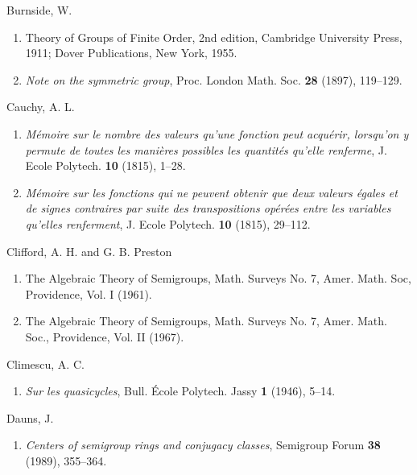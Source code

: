 \documentclass{surv-l}
\numberwithin{equation}{section}
\numberwithin{table}{section}
\numberwithin{figure}{section}
\theoremstyle{plain}
\theoremstyle{definition}
\begin{document}
\begin{thebibliography}{}
\item[] Burnside, W.
\begin{enumerate}
\item \label{bib6b} Theory of Groups of Finite Order, 2nd edition, Cambridge
University Press, 1911; Dover Publications, New York,
1955.

\item \label{bib6a} \emph{Note on the symmetric group}, Proc. London Math.
Soc. \textbf{28} (1897), 119--129.
\end{enumerate}

\item[] Cauchy, A. L.
\begin{enumerate}
\item \label{bib7} \emph{M\'{e}moire sur le nombre des valeurs qu'une fonction peut acqu\'{e}rir, lorsqu'on y permute
de toutes les mani\`{e}res possibles les quantit\'{e}s
qu'elle renferme}, J. Ecole Polytech. \textbf{10} (1815),
1--28.

\item \label{bib7a} \emph{M\'{e}moire sur les fonctions qui ne peuvent
obtenir que deux valeurs \'{e}gales et de signes
contraires par suite des transpositions op\'{e}r\'{e}es
entre les variables qu'elles renferment}, J. Ecole
Polytech. \textbf{10} (1815), 29--112.
\end{enumerate}

\item[] Clifford, A. H. and G. B. Preston
\begin{enumerate}
\item \label{bib8} The Algebraic Theory of Semigroups, Math. Surveys No. 7,
Amer. Math. Soc, Providence, Vol. I (1961).

\item \label{bib8a} The Algebraic Theory of Semigroups, Math. Surveys No. 7,
Amer. Math. Soc., Providence, Vol. II (1967).
\end{enumerate}

\item[] Climescu, A. C.
\begin{enumerate}
\item \label{bib9} \emph{Sur les quasicycles}, Bull. \'{E}cole Polytech.
Jassy \textbf{1} (1946), 5--14.
\end{enumerate}

\item[] Dauns, J.
\begin{enumerate}
\item \label{bib10} \emph{Centers of semigroup rings and conjugacy
classes}, Semigroup Forum \textbf{38} (1989), 355--364.
\end{enumerate}


\end{thebibliography}
\end{document}
